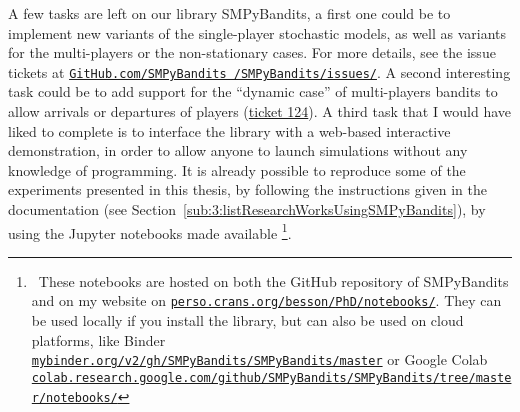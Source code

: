 A few tasks are left on our library SMPyBandits, a first one could be to implement new variants of the single-player stochastic models, as well as variants for the multi-players or the non-stationary cases.
For more details, see the issue tickets at \href{https://github.com/SMPyBandits/SMPyBandits/issues/}{\texttt{GitHub.com/SMPyBandits /SMPyBandits/issues/}}.
%
A second interesting task could be
to add support for the ``dynamic case'' of multi-players bandits to allow arrivals or departures of players (\href{https://github.com/SMPyBandits/SMPyBandits/issues/124}{ticket 124}).
%
A third task that I would have liked to complete is to interface the library with a web-based interactive demonstration, in order to allow anyone to launch simulations without any knowledge of programming.
It is already possible to reproduce some of the experiments presented in this thesis,
by following the instructions given in the documentation (see Section~\ref{sub:3:listResearchWorksUsingSMPyBandits}),
by using the Jupyter notebooks \cite{jupyter} made available%
\footnote{~These notebooks are hosted on both the GitHub repository of SMPyBandits and on my website on \href{https://perso.crans.org/besson/PhD/notebooks/}{\texttt{perso.crans.org/besson/PhD/notebooks/}}. They can be used locally if you install the library, but can also be used on cloud platforms, like Binder \href{https://mybinder.org/v2/gh/SMPyBandits/SMPyBandits/master}{\texttt{mybinder.org/v2/gh/SMPyBandits/SMPyBandits/master}} or Google Colab \href{https://colab.research.google.com/github/SMPyBandits/SMPyBandits/tree/master/notebooks/}{\texttt{colab.research.google.com/github/SMPyBandits/SMPyBandits/tree/master/notebooks/}}}.



